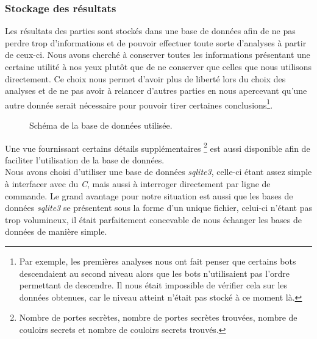 \documentclass[a4paper,12pt]{article}
\begin{document}
\subsubsection{Stockage des résultats}
Les résultats des parties sont stockés dans une base de données afin de ne pas
perdre trop d'informations et de pouvoir effectuer toute sorte d'analyses à
partir de ceux-ci. Nous avons cherché à conserver toutes les informations
présentant une certaine utilité à nos yeux plutôt que de ne conserver que celles
que nous utilisons directement. Ce choix nous permet d'avoir plus de liberté
lors du choix des analyses et de ne pas avoir à relancer d'autres parties en
nous apercevant qu'une autre donnée serait nécessaire pour pouvoir tirer
certaines conclusions\footnote{Par exemple, les premières analyses nous ont fait
  penser que certains bots descendaient au second niveau alors que les bots
  n'utilisaient pas l'ordre permettant de descendre. Il nous était impossible de
  vérifier cela sur les données obtenues, car le niveau atteint n'était pas
  stocké à ce moment là.}.
\begin{figure}[H]
	\caption{\label{fig:schema} Schéma de la base de données utilisée.}
\end{figure}
Une vue
fournissant certains détails supplémentaires \footnote{Nombre de portes
secrètes, nombre de portes secrètes trouvées, nombre de couloirs secrets et
nombre de couloirs secrets trouvés.} est aussi disponible afin de faciliter
l'utilisation de la base de données.
\\
Nous avons choisi d'utiliser une base de données {\em sqlite3}, celle-ci étant
assez simple à interfacer avec du {\em C}, mais aussi à interroger directement
par ligne de commande. Le grand avantage pour notre situation est aussi que les
bases de données {\em sqlite3} se présentent sous la forme d'un unique fichier,
celui-ci n'étant pas trop volumineux, il était parfaitement concevable de nous
échanger les bases de données de manière simple.
\end{document}
